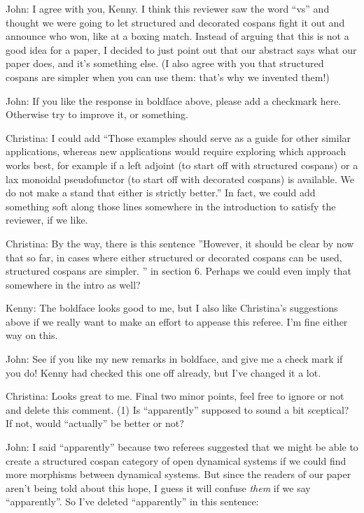 \documentclass[reqno]{amsart}
\def\chris{\color{purple} Christina: }
\def\john{\color{red} John: }
\def\kenny{\color{blue} Kenny: }
\begin{document}
\begin{enumerate}
{\john I agree with you, Kenny.  I think this reviewer saw the word ``vs'' and thought we were going to let structured and decorated cospans fight it out and announce who won, like at a boxing match.   Instead of arguing that this is not a good idea for a paper, I decided to just point out that our abstract says what our paper does, and it's something else.   (I also agree with you that structured cospans are simpler when you can use them: that's why we invented them!)}

{\john If you like the response in boldface above, please add a checkmark here.  Otherwise try to
improve it, or something.} 

{\chris I could add ``Those examples should serve as a guide for other similar applications, 
whereas new applications would require exploring which approach works best, for example if a left adjoint (to start off with structured cospans) or a 
lax monoidal pseudofunctor (to start off with decorated cospans) is available. We do not make a stand that either is strictly better.'' In fact, we 
could add something soft along those lines somewhere in the introduction to satisfy the reviewer, if we like.}

{\chris By the way, there is this sentence ''However, it should be clear by now that so
far, in cases where either structured or decorated cospans can be used, structured cospans are simpler. '' in section 6. Perhaps we could even imply 
that somewhere in the intro as well?}

{\kenny The boldface looks good to me, but I also like Christina's suggestions above if we really want to make an effort to appease this referee. I'm fine either way on this.}


{\john See if you like my new remarks in boldface, and give me a check mark if you do!  Kenny had checked this one off already, but I've changed it a 
lot.}

{\chris Looks great to me. Final two minor points, feel free to ignore or not and delete this comment. (1) Is ``apparently'' supposed to sound a bit 
sceptical? If not, would ``actually'' be better or not?}

{\john I said ``apparently'' because two referees suggested that we might be able to create a structured cospan category of open dynamical systems if we could find more morphisms between dynamical systems.  But since the readers of our paper aren't being told about this hope, I guess it will confuse \emph{them} if we say ``apparently''.   So I've deleted ``apparently'' in this sentence: 

}
\end{enumerate}
\end{document}
